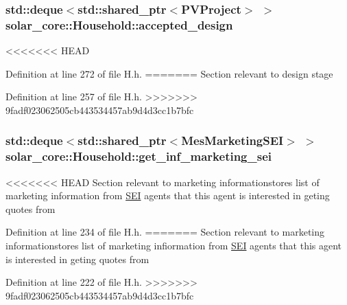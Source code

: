 \hypertarget{classsolar__core_1_1_household_ad4409e81251bdd33d9dca1cd1225dc75}{}
\subsubsection[{accepted\+\_\+design}]{\setlength{\rightskip}{0pt plus 5cm}std\+::deque$<$std\+::shared\+\_\+ptr$<${\bf P\+V\+Project}$>$ $>$ solar\+\_\+core\+::\+Household\+::accepted\+\_\+design\hspace{0.3cm}{\ttfamily [protected]}}\label{classsolar__core_1_1_household_ad4409e81251bdd33d9dca1cd1225dc75}
<<<<<<< HEAD


Definition at line 272 of file H.\+h.
=======
Section relevant to design stage 

Definition at line 257 of file H.\+h.
>>>>>>> 9fadf023062505cb443534457ab9d4d3cc1b7bfc

\hypertarget{classsolar__core_1_1_household_a3ae4cec5fca43ee5ca3287a01f5a05a2}{}
\subsubsection[{get\+\_\+inf\+\_\+marketing\+\_\+sei}]{\setlength{\rightskip}{0pt plus 5cm}std\+::deque$<$std\+::shared\+\_\+ptr$<${\bf Mes\+Marketing\+S\+E\+I}$>$ $>$ solar\+\_\+core\+::\+Household\+::get\+\_\+inf\+\_\+marketing\+\_\+sei\hspace{0.3cm}{\ttfamily [protected]}}\label{classsolar__core_1_1_household_a3ae4cec5fca43ee5ca3287a01f5a05a2}
<<<<<<< HEAD
Section relevant to marketing informationstores list of marketing information from \hyperlink{classsolar__core_1_1_s_e_i}{S\+E\+I} agents that this agent is interested in geting quotes from 

Definition at line 234 of file H.\+h.
=======
Section relevant to marketing informationstores list of marketing infiormation from \hyperlink{classsolar__core_1_1_s_e_i}{S\+E\+I} agents that this agent is interested in geting quotes from 

Definition at line 222 of file H.\+h.
>>>>>>> 9fadf023062505cb443534457ab9d4d3cc1b7bfc

